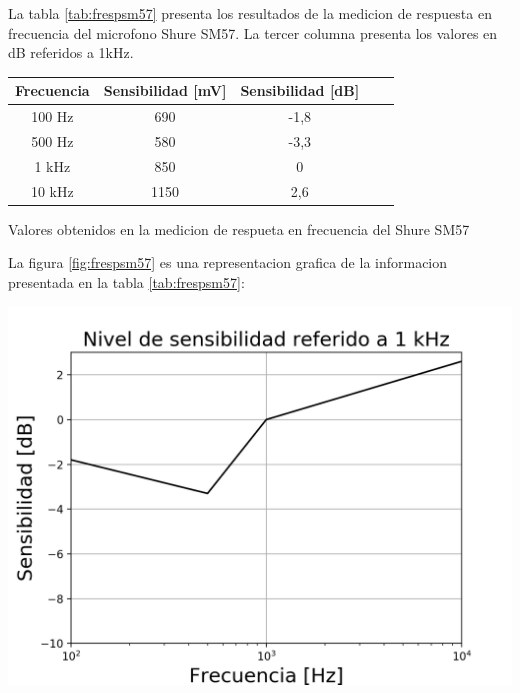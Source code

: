 \documentclass[]{article}
\makeatletter
\newenvironment{tablehere}    %
  {\def\@captype{table}}    %

  {}              %
\newenvironment{figurehere}   %
  {\def\@captype{figure}}   %
  {\par\medskip}
  {}              %
\makeatother
\begin{document}
\begin{multicols}{2}
La tabla \ref{tab:frespsm57} presenta los resultados de la medicion de respuesta en
frecuencia del microfono Shure SM57. La tercer columna presenta los valores en dB
referidos a 1kHz.

\begin{tablehere}
\begin{center}
\begin{tabular}{|c|c|c|c|c|}
\hline
Frecuencia & Sensibilidad [mV] & Sensibilidad [dB] \\
\hline
100 Hz & 690    & -1,8 \\
500 Hz & 580    & -3,3 \\
1  kHz & 850    & 0    \\
10 kHz & 1150   & 2,6  \\
\hline
\end{tabular}
\caption{Valores obtenidos en la medicion de respueta en frecuencia del
Shure SM57}
\label{tab:frespsm57}
\end{center}
\end{tablehere}
La figura \ref{fig:frespsm57} es una representacion grafica de la informacion
presentada en la tabla \ref{tab:frespsm57}:

\begin{figurehere}
 \centering
 \includegraphics[width=\linewidth]{frespsm57}
 \label{fig:frespsm57}
\end{figurehere}






\end{multicols}
\end{document}
